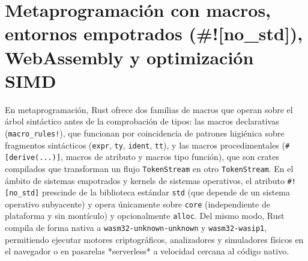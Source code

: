 \documentclass{book}
\begin{document}
\section{Metaprogramación con macros, entornos empotrados (\#![no\_std]), WebAssembly y optimización SIMD}

En metaprogramación, Rust ofrece dos familias de macros que operan sobre el árbol sintáctico antes de la comprobación de tipos: las macros declarativas (\texttt{macro\_rules!}), que funcionan por coincidencia de patrones higiénica sobre fragmentos sintácticos (\texttt{expr}, \texttt{ty}, \texttt{ident}, \texttt{tt}), y las macros procedimentales (\texttt{\#[derive(...)]}, macros de atributo y macros tipo función), que son crates compilados que transforman un flujo \texttt{TokenStream} en otro \texttt{TokenStream}. En el ámbito de sistemas empotrados y kernels de sistemas operativos, el atributo \texttt{\#![no\_std]} prescinde de la biblioteca estándar \texttt{std} (que depende de un sistema operativo subyacente) y opera únicamente sobre \texttt{core} (independiente de plataforma y sin montículo) y opcionalmente \texttt{alloc}. Del mismo modo, Rust compila de forma nativa a \texttt{wasm32-unknown-unknown} y \texttt{wasm32-wasip1}, permitiendo ejecutar motores criptográficos, analizadores y simuladores físicos en el navegador o en pasarelas *serverless* a velocidad cercana al código nativo.
\end{document}
